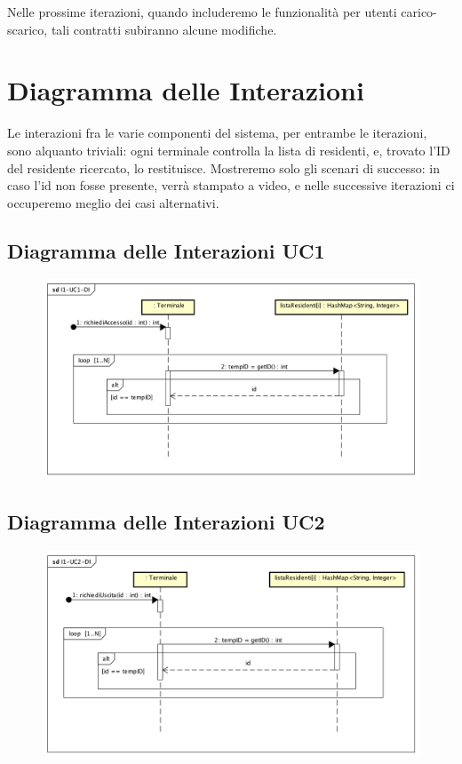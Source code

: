 \documentclass[12pt, letterpaper]{article}
\begin{document}
\noindent
Nelle prossime iterazioni, quando includeremo
le funzionalità per utenti carico-scarico,
tali contratti subiranno alcune modifiche.

\section{Diagramma delle Interazioni}
Le interazioni fra le varie componenti del sistema, 
per entrambe le iterazioni, sono alquanto triviali:
ogni terminale controlla la lista di residenti, e, 
trovato l'ID del residente ricercato, lo restituisce.
Mostreremo solo gli scenari di successo: in caso 
l'id non fosse presente, verrà stampato a video,
e nelle successive iterazioni ci occuperemo meglio
dei casi alternativi.

\subsection{Diagramma delle Interazioni UC1}
\begin{figure}[H]
    \centering
    \includegraphics[scale=0.45]{I1-UC1-DI}
    \label{fig:mesh1}
\end{figure}

\subsection{Diagramma delle Interazioni UC2}
\begin{figure}[H]
    \centering
    \includegraphics[scale=0.45]{I1-UC2-DI}
    \label{fig:mesh1}
\end{figure}
\end{document}
